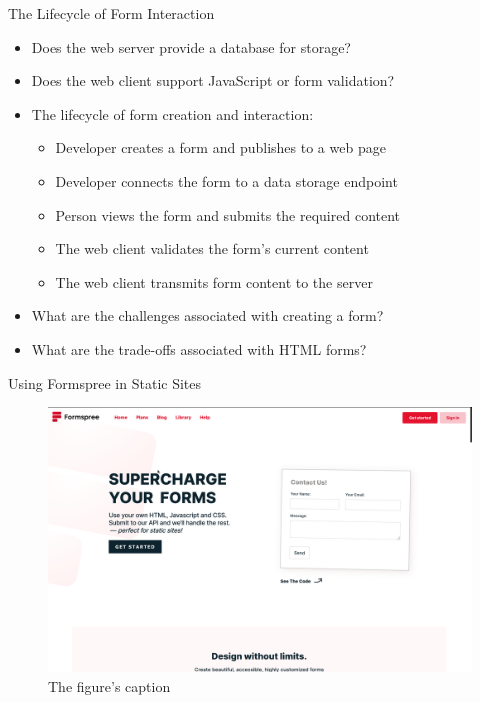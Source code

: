 \documentclass[14pt,aspectratio=169]{beamer}
\begin{document}
%
\begin{frame}{The Lifecycle of Form Interaction}
  \begin{itemize}
    \item Does the web server provide a database for storage?
      \vspace*{-.2in}
    \item Does the web client support JavaScript or form validation?
      \vspace*{-.2in}
    \item The lifecycle of form creation and interaction:
      \begin{itemize}
        \item Developer creates a form and publishes to a web page
        \item Developer connects the form to a data storage endpoint
        \item Person views the form and submits the required content
        \item The web client validates the form's current content
        \item The web client transmits form content to the server
      \end{itemize}
      \vspace*{-.25in}
    \item What are the challenges associated with creating a form?
      \vspace*{-.25in}
    \item What are the trade-offs associated with HTML forms?
  \end{itemize}
\end{frame}

%
\begin{frame}{Using Formspree in Static Sites}
  \begin{figure}
    \centering
    \includegraphics[scale=.08]{images/formspree.png}
    \caption{The figure's caption}
  \end{figure}
\end{frame}
\end{document}
